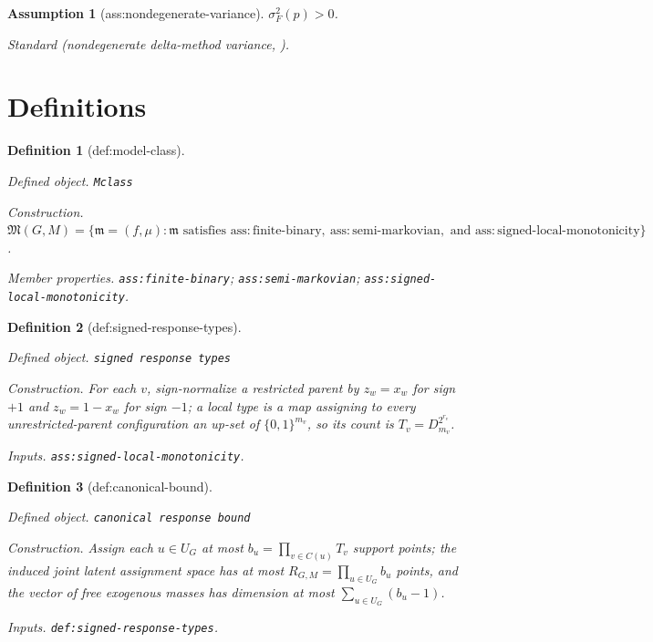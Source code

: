 \documentclass{article}
\newtheorem{assumption}{Assumption}
\newtheorem{definition}{Definition}
\begin{document}
\begin{assumption}[ass:nondegenerate-variance]\label{ass:nondegenerate-variance}
\(\sigma_F^2(p)>0\).
\par\smallskip\noindent\emph{Standard} (nondegenerate delta-method variance, \cite{VanDerVaart1998}).
\end{assumption}

\section{Definitions}

\begin{definition}[def:model-class]\label{def:model-class}
\par\smallskip\noindent\emph{Defined object.} \texttt{Mclass}
\par\smallskip\noindent\emph{Construction.} \(\mathfrak M(G,M)=\{\mathfrak m=(f,\mu):\mathfrak m\text{ satisfies }\mathrm{ass:finite\text{-}binary},\ \mathrm{ass:semi\text{-}markovian},\text{ and }\mathrm{ass:signed\text{-}local\text{-}monotonicity}\}\).
\par\smallskip\noindent\emph{Member properties.} \texttt{ass:\allowbreak{}finite-\allowbreak{}binary}; \texttt{ass:\allowbreak{}semi-\allowbreak{}markovian}; \texttt{ass:\allowbreak{}signed-\allowbreak{}local-\allowbreak{}monotonicity}.
\end{definition}

\begin{definition}[def:signed-response-types]\label{def:signed-response-types}
\par\smallskip\noindent\emph{Defined object.} \texttt{signed response types}
\par\smallskip\noindent\emph{Construction.} For each \(v\), sign-normalize a restricted parent by \(z_w=x_w\) for sign \(+1\) and \(z_w=1-x_w\) for sign \(-1\); a local type is a map assigning to every unrestricted-parent configuration an up-set of \(\{0,1\}^{m_v}\), so its count is \(T_v=D_{m_v}^{2^{r_v}}\).
\par\smallskip\noindent\emph{Inputs.} \texttt{ass:\allowbreak{}signed-\allowbreak{}local-\allowbreak{}monotonicity}.
\end{definition}

\begin{definition}[def:canonical-bound]\label{def:canonical-bound}
\par\smallskip\noindent\emph{Defined object.} \texttt{canonical response bound}
\par\smallskip\noindent\emph{Construction.} Assign each \(u\in U_G\) at most \(b_u=\prod_{v\in C(u)}T_v\) support points; the induced joint latent assignment space has at most \(R_{G,M}=\prod_{u\in U_G}b_u\) points, and the vector of free exogenous masses has dimension at most \(\sum_{u\in U_G}(b_u-1)\).
\par\smallskip\noindent\emph{Inputs.} \texttt{def:\allowbreak{}signed-\allowbreak{}response-\allowbreak{}types}.
\end{definition}
\end{document}
